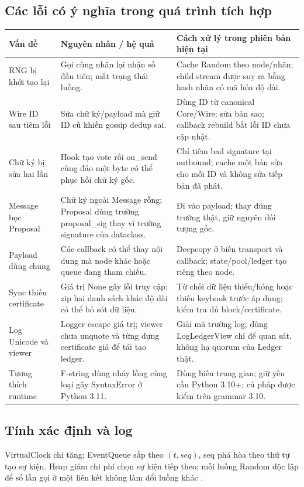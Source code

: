 \documentclass[11pt,a4paper]{article}
\begin{document}
\subsection{Các lỗi có ý nghĩa trong quá trình tích hợp}
{\small\begin{tabularx}{\linewidth}{P{33mm}Y Y}
\toprule\textbf{Vấn đề} & \textbf{Nguyên nhân / hệ quả} & \textbf{Cách xử lý trong phiên bản hiện tại}\\\midrule
RNG bị khởi tạo lại & Gọi cùng nhãn lại nhận số đầu tiên; mất trạng thái luồng. & Cache Random theo node/nhãn; child stream được suy ra bằng hash nhãn có mã hóa độ dài.\\
Wire ID sau tiêm lỗi & Sửa chữ ký/payload mà giữ ID cũ khiến gossip dedup sai. & Dùng ID từ canonical Core/Wire; sửa bản sao; callback rebuild bắt lỗi ID chưa cập nhật.\\
Chữ ký bị sửa hai lần & Hook tạo vote rồi on\_send cùng đảo một byte có thể phục hồi chữ ký gốc. & Chỉ tiêm bad signature tại outbound; cache một bản sửa cho mỗi ID và không sửa tiếp bản đã phát.\\
Message bọc Proposal & Chữ ký ngoài Message rỗng; Proposal dùng trường proposal\_sig thay vì trường signature của dataclass. & Đi vào payload; thay đúng trường thật, giữ nguyên đối tượng gốc.\\
Payload dùng chung & Các callback có thể thay nội dung mà node khác hoặc queue đang tham chiếu. & Deepcopy ở biên transport và callback; state/pool/ledger tạo riêng theo node.\\
Sync thiếu certificate & Giá trị None gây lỗi truy cập; zip hai danh sách khác độ dài có thể bỏ sót dữ liệu. & Từ chối dữ liệu thiếu/hỏng hoặc thiếu keybook trước áp dụng; kiểm tra đủ block/certificate.\\
Log Unicode và viewer & Logger escape giá trị; viewer chưa unquote và từng dựng certificate giả để tái tạo ledger. & Giải mã trường log; dùng LogLedgerView chỉ để quan sát, không hạ quorum của Ledger thật.\\
Tương thích runtime & F-string dùng nháy lồng cùng loại gây SyntaxError ở Python 3.11. & Dùng biến trung gian; giữ yêu cầu Python 3.10+; cú pháp được kiểm trên grammar 3.10.\\
\bottomrule\end{tabularx}}

\subsection{Tính xác định và log}
VirtualClock chỉ tăng; EventQueue sắp theo $(t,seq)$, seq phá hòa theo thứ tự tạo sự kiện. Heap giảm chi phí chọn sự kiện tiếp theo; mỗi luồng Random độc lập để số lần gọi ở một liên kết không làm đổi luồng khác \cite{heapq,random}.
\end{document}
